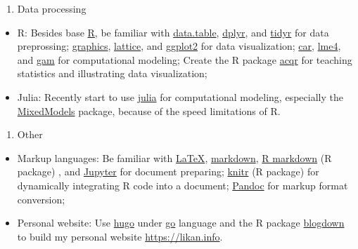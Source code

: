 \documentclass[12pt,]{article}
\providecommand{\tightlist}{%
  \setlength{\itemsep}{0pt}\setlength{\parskip}{0pt}}
\begin{document}
\begin{enumerate}
\def\labelenumi{\arabic{enumi}.}
\setcounter{enumi}{1}
\tightlist
\item
  Data processing
\end{enumerate}

\begin{itemize}
\tightlist
\item
  R: Besides base \href{https://www.r-project.org}{R}, be familiar with
  \href{http://r-datatable.com}{data.table},
  \href{https://cran.r-project.org/web/packages/dplyr/index.html}{dplyr},
  and
  \href{https://cran.r-project.org/web/packages/tidyr/index.html}{tidyr}
  for data preprossing;
  \href{https://stat.ethz.ch/R-manual/R-devel/library/graphics/html/00Index.html}{graphics},
  \href{https://cran.r-project.org/package=lattice}{lattice}, and
  \href{http://ggplot2.tidyverse.org}{ggplot2} for data visualization;
  \href{https://cran.r-project.org/web/packages/car/index.html}{car},
  \href{https://github.com/lme4/lme4}{lme4}, and
  \href{https://cran.r-project.org/web/packages/gam/index.html}{gam} for
  computational modeling; Create the R package
  \href{https://github.com/likanzhan/acqr}{acqr} for teaching statistics
  and illustrating data visualization;
\item
  Julia: Recently start to use \href{https://julialang.org}{julia} for
  computational modeling, especially the
  \href{https://github.com/dmbates/MixedModels.jl}{MixedModels} package,
  because of the speed limitations of R.
\end{itemize}

\begin{enumerate}
\def\labelenumi{\arabic{enumi}.}
\setcounter{enumi}{2}
\tightlist
\item
  Other
\end{enumerate}

\begin{itemize}
\tightlist
\item
  Markup languages: Be familiar with
  \href{https://www.latex-project.org}{LaTeX},
  \href{https://daringfireball.net/projects/markdown/}{markdown},
  \href{https://rmarkdown.rstudio.com}{R markdown} (R package) , and
  \href{https://jupyter.org}{Jupyter} for document preparing;
  \href{https://cran.r-project.org/web/packages/knitr/index.html}{knitr}
  (R package) for dynamically integrating R code into a document;
  \href{https://pandoc.org}{Pandoc} for markup format conversion;
\item
  Personal website: Use \href{https://gohugo.io}{hugo} under
  \href{https://golang.org}{go} language and the R package
  \href{https://github.com/rstudio/blogdown}{blogdown} to build my
  personal website \url{https://likan.info}.
\end{itemize}
\end{document}
